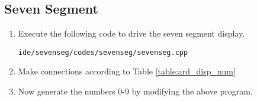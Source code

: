 \documentclass[journal]{IEEEtran}
\begin{document}
\subsection{Seven Segment}
\begin{enumerate}[label=\arabic*.,ref=\theenumi]
\item Execute the following code to drive the seven segment display.
\begin{lstlisting}
ide/sevenseg/codes/sevenseg/sevenseg.cpp
\end{lstlisting}
\item
Make connections according to Table \ref{table:ard_disp_num}
\begin{table}[H]
\centering

\caption{}
\label{table:ard_disp_num}
\end{table}

\item
Now generate the numbers 0-9 by modifying the above program.

\end{enumerate}
\end{document}
